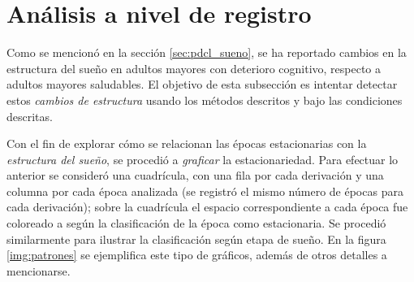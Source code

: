 \documentclass[12pt,letterpaper,draft]{book}
\begin{document}
\section{Análisis a nivel de registro}
\label{sec:analisis_registro}

Como se mencionó en la sección \ref{sec:pdcl_sueno}, se ha reportado cambios en la estructura del sueño en adultos mayores con deterioro cognitivo, respecto a adultos mayores saludables.
%
El objetivo de esta subsección es intentar detectar estos \textit{cambios de estructura} usando los métodos descritos y bajo las condiciones descritas.

Con el fin de explorar cómo se relacionan las épocas estacionarias con la \textit{estructura del sueño}, se procedió a \textit{graficar} la estacionariedad.
%
Para efectuar lo anterior se consideró una cuadrícula, con una fila por cada derivación y una columna por cada época analizada (se registró el mismo número de épocas para cada derivación); sobre la cuadrícula el espacio correspondiente a cada época fue coloreado a según la clasificación de la época como estacionaria.
%
Se procedió similarmente para ilustrar la clasificación según etapa de sueño.
%
En la figura \ref{img:patrones} se ejemplifica este tipo de gráficos, además de otros detalles a mencionarse.
\end{document}
